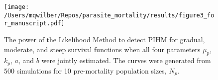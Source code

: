\documentclass[12pt, a4paper]{article}
\begin{document}
\begin{figure}
    \texttt{[image: /Users/mqwilber/Repos/parasite\_mortality/results/figure3\_for\_manuscript.pdf]}

    \caption{The power of the Likelihood Method to detect PIHM for gradual, moderate, and steep survival functions when all four parameters $\mu_p$, $k_p$, $a$, and $b$ were jointly estimated. The curves were generated from 500 simulations for 10 pre-mortality population sizes, $N_p$.}

    \label{fig:real_power}

\end{figure}
\end{document}

